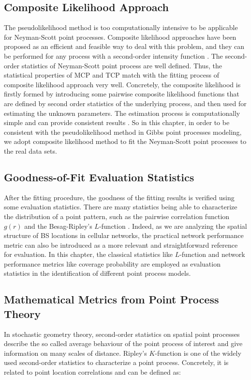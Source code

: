 \subsection*{Composite Likelihood Approach}
The pseudolikelihood method is too computationally intensive to be applicable for Neyman-Scott point processes. Composite likelihood approaches have been proposed as an efficient and feasible way to deal with this problem, and they can be performed for any process with a second-order intensity function \cite{chiu2013stochastic}. The second-order statistics of Neyman-Scott point process are well defined. Thus, the statistical properties of MCP and TCP match with the fitting process of composite likelihood approach very well. Concretely, the composite likelihood is firstly formed by introducing some pairwise composite likelihood functions that are defined by second order statistics of the underlying process, and then used for estimating the unknown parameters. The estimation process is computationally simple and can provide consistent results \cite{guan2006composite}. So in this chapter, in order to be consistent with the pseudolikelihood method in Gibbs point processes modeling, we adopt composite likelihood method to fit the Neyman-Scott point processes to the real data sets.

\subsection{Goodness-of-Fit Evaluation Statistics}
After the fitting procedure, the goodness of the fitting results is verified using some evaluation statistics. There are many statistics being able to characterize the distribution of a point pattern, such as the pairwise correlation function $g(r)$ and the Besag-Ripley's $L$-function \cite{chiu2013stochastic}. Indeed, as we are analyzing the spatial structure of BS locations in cellular networks, the practical network performance metric can also be introduced as a more relevant and straightforward reference for evaluation. In this chapter, the classical statistics like $L$-function and network performance metrics like coverage probability are employed as evaluation statistics in the identification of different point process models.

\subsection*{Mathematical Metrics from Point Process Theory}

In stochastic geometry theory, second-order statistics on spatial point processes describe the so called average behaviour of the point process of interest and give information on many scales of distance. Ripley's $K$-function is one of the widely used second-order statistics to characterize a point process. Concretely, it is related to point location correlations and can be defined as:

